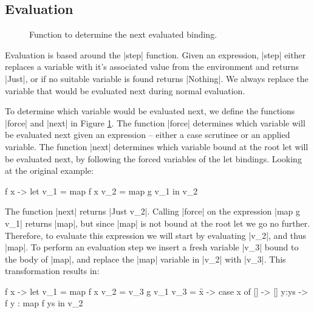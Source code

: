 \documentclass[draft]{sigplanconf}
\begin{document}
\subsection{Evaluation}
\label{sec:eval}

\begin{figure}
\caption{Function to determine the next evaluated binding.}
\label{fig:stack}
\end{figure}

Evaluation is based around the |step| function. Given an expression, |step| either replaces a variable with it's associated value from the environment and returns |Just|, or if no suitable variable is found returns |Nothing|. We always replace the variable that would be evaluated next during normal evaluation.

To determine which variable would be evaluated next, we define the functions |force| and |next| in Figure \ref{fig:stack}. The function |force| determines which variable will be evaluated next given an expression -- either a case scrutinee or an applied variable. The function |next| determines which variable bound at the root let will be evaluated next, by following the forced variables of the let bindings. Looking at the original example:

\begin{code}
\g f x ->  let  v_1 =  map f x
                v_2 =  map g v_1
           in   v_2
\end{code}

The function |next| returns |Just v_2|. Calling |force| on the expression |map g v_1| returns |map|, but since |map| is not bound at the root let we go no further. Therefore, to evaluate this expression we will start by evaluating |v_2|, and thus |map|. To perform an evaluation step we insert a fresh variable |v_3| bound to the body of |map|, and replace the |map| variable in |v_2| with |v_3|. This transformation results in:

\begin{code}
\g f x ->  let  v_1 =  map f x
                v_2 =  v_3 g v_1
                v_3 =  \f x -> case  x of
                                     []    -> []
                                     y:ys  -> f y : map f ys
           in   v_2
\end{code}
\end{document}
